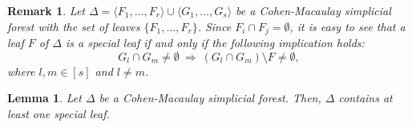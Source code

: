 \documentclass[10pt,a4paper]{amsart}
\newtheorem{remark}{Remark}
\newtheorem{lemma}{Lemma}
\def\l{\langle}
\def\r{\rangle}
\begin{document}
    \begin{remark}\label{CM special leaf remark}
        Let $\Delta=\l F_1,\ldots,F_r\r\cup\l G_1,\ldots,G_s\r$ be a Cohen-Macaulay simplicial forest with the set of leaves $\{F_1,\ldots,F_r\}$. Since $F_i\cap F_j=\emptyset$, it is easy to see that a leaf $F$ of $\Delta$ is a special leaf if and only if the following implication holds:
        \[
G_l\cap G_m\neq\emptyset \ \Rightarrow \ (G_l\cap G_m)\setminus F\neq \emptyset,
        \]
    where $l,m\in[s]$ and $l\neq m$.
    \end{remark}

\begin{lemma}\label{special leaf existence}
    Let $\Delta$ be a Cohen-Macaulay simplicial forest. Then, $\Delta$ contains at least one special leaf.
\end{lemma}
\end{document}

